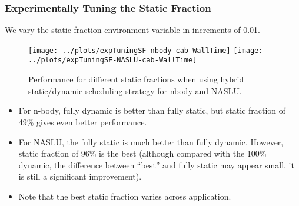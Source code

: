 \begin{frame}[label=expTuningSF]
\frametitle{Experimentally Tuning the Static Fraction}
{\tiny We vary the static fraction environment variable in increments of 0.01.  } 
\begin{figure}[ht]
\begin{center} 
\texttt{[image: ../plots/expTuningSF-nbody-cab-WallTime]}
\texttt{[image: ../plots/expTuningSF-NASLU-cab-WallTime]}\\
\end{center} 
\begin{center}
{\small Performance for different static fractions when using hybrid static/dynamic scheduling strategy for nbody and NASLU. }
\end{center}
\end{figure}

\begin{itemize}
\tiny \item \tiny For n-body, fully dynamic is better than fully static, but static fraction of 49\% gives even better performance. 
\item \tiny For NASLU, the fully static is much better than fully
  dynamic. However, static fraction of 96\% is the best (although
  compared with the 100\% dynamic, the difference between ``best'' and
  fully static may appear small, it is still a significant
  improvement).  
\item \tiny Note that the best static fraction varies across
  application. 
\end{itemize}
\end{frame} 


